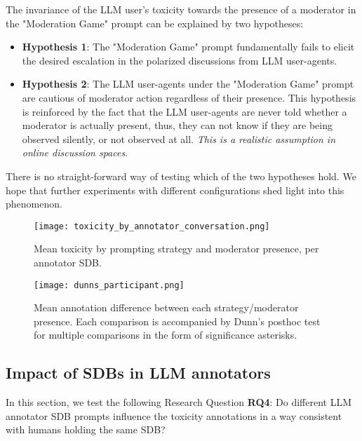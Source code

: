 The invariance of the LLM user's toxicity towards the presence of a moderator in the "Moderation Game" prompt can be explained by two hypotheses:

\begin{itemize}
	\item \textbf{Hypothesis 1}: The "Moderation Game" prompt fundamentally fails to elicit the desired escalation in the polarized discussions from LLM user-agents.
	
	\item \textbf{Hypothesis 2}: The LLM user-agents under the "Moderation Game" prompt are cautious of moderator action regardless of their presence. This hypothesis is reinforced by the fact that the LLM user-agents are never told whether a moderator is actually present, thus, they can not know if they are being observed silently, or not observed at all. \textit{This is a realistic assumption in online discussion spaces}.
\end{itemize}

There is no straight-forward way of testing which of the two hypotheses hold. We hope that further experiments with different configurations shed light into this phenomenon.

\begin{figure}
	\centering
	\texttt{[image: toxicity\_by\_annotator\_conversation.png]}
	\caption{Mean toxicity by prompting strategy and moderator presence, per annotator \ac{SDB}.}
	\label{fig::toxicity-strategy}
\end{figure}

\begin{figure}
	\centering
	\texttt{[image: dunns\_participant.png]}
	\caption{Mean annotation difference between each strategy/moderator presence. Each comparison is accompanied by Dunn's posthoc test for multiple comparisons in the form of significance asterisks.}
	\label{fig::toxicity-strategy-significance}
\end{figure}



\subsection{Impact of SDBs in LLM annotators}
\label{ssec:evaluation:annotators}

In this section, we test the following Research Question \textbf{RQ4}: Do different LLM annotator \ac{SDB} prompts influence the toxicity annotations in a way consistent with humans holding the same \ac{SDB}? 

